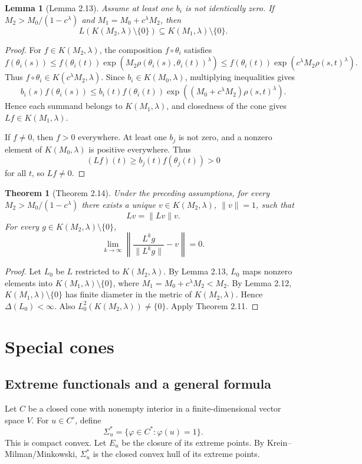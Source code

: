 \documentclass[11pt]{article}
\newtheorem{theorem}{Theorem}
\newtheorem{lemma}{Lemma}
\begin{document}
\begin{lemma}[Lemma 2.13]
Assume at least one \(b_i\) is not identically zero.  If \(M_2>M_0/(1-c^\lambda)\) and \(M_1=M_0+c^\lambda M_2\), then
\[
  L(K(M_2,\lambda)\setminus\{0\})\subseteq K(M_1,\lambda)\setminus\{0\}.
\]
\end{lemma}

\begin{proof}
For \(f\in K(M_2,\lambda)\), the composition \(f\circ\theta_i\) satisfies
\[
  f(\theta_i(s))
  \le f(\theta_i(t))
  \exp(M_2\rho(\theta_i(s),\theta_i(t))^\lambda)
  \le f(\theta_i(t))
  \exp(c^\lambda M_2\rho(s,t)^\lambda).
\]
Thus \(f\circ\theta_i\in K(c^\lambda M_2,\lambda)\).  Since \(b_i\in K(M_0,\lambda)\), multiplying inequalities gives
\[
  b_i(s)f(\theta_i(s))
  \le b_i(t)f(\theta_i(t))
  \exp((M_0+c^\lambda M_2)\rho(s,t)^\lambda).
\]
Hence each summand belongs to \(K(M_1,\lambda)\), and closedness of the cone gives \(Lf\in K(M_1,\lambda)\).

If \(f\ne0\), then \(f>0\) everywhere.  At least one \(b_j\) is not zero, and a nonzero element of \(K(M_0,\lambda)\) is positive everywhere.  Thus
\[
  (Lf)(t)\ge b_j(t)f(\theta_j(t))>0
\]
for all \(t\), so \(Lf\ne0\).
\end{proof}

\begin{theorem}[Theorem 2.14]
Under the preceding assumptions, for every \(M_2>M_0/(1-c^\lambda)\) there exists a unique \(v\in K(M_2,\lambda)\), \(\|v\|=1\), such that
\[
  Lv=\|Lv\|v.
\]
For every \(g\in K(M_2,\lambda)\setminus\{0\}\),
\[
  \lim_{k\to\infty}\left\|\frac{L^k g}{\|L^k g\|}-v\right\|=0.
\]
\end{theorem}

\begin{proof}
Let \(L_0\) be \(L\) restricted to \(K(M_2,\lambda)\).  By Lemma 2.13, \(L_0\) maps nonzero elements into \(K(M_1,\lambda)\setminus\{0\}\), where \(M_1=M_0+c^\lambda M_2<M_2\).  By Lemma 2.12, \(K(M_1,\lambda)\setminus\{0\}\) has finite diameter in the metric of \(K(M_2,\lambda)\).  Hence \(\Delta(L_0)<\infty\).  Also \(L_0^2(K(M_2,\lambda))\ne\{0\}\).  Apply Theorem 2.11.
\end{proof}

\section{Special cones}

\subsection{Extreme functionals and a general formula}
Let \(C\) be a closed cone with nonempty interior in a finite-dimensional vector space \(V\).  For \(u\in C^\circ\), define
\[
  \Sigma_u^*=\{\varphi\in C^*: \varphi(u)=1\}.
\]
This is compact convex.  Let \(E_u\) be the closure of its extreme points.  By Krein--Milman/Minkowski, \(\Sigma_u^*\) is the closed convex hull of its extreme points.
\end{document}
